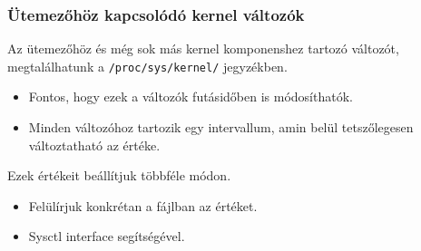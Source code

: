 \documentclass{beamer}
\begin{document}
\begin{frame}
\frametitle{ Ütemezőhöz kapcsolódó kernel változók}
Az ütemezőhöz és még sok más kernel komponenshez tartozó változót, megtalálhatunk a \texttt{/proc/sys/kernel/} jegyzékben.
\begin{itemize}
\item Fontos, hogy ezek a változók futásidőben is módosíthatók.
\item Minden változóhoz tartozik egy intervallum, amin belül tetszőlegesen változtatható az értéke. 
\end{itemize} 

Ezek értékeit beállítjuk többféle módon.
\begin{itemize}
\item Felülírjuk konkrétan a fájlban az értéket.
\item Sysctl interface segítségével.
\end{itemize}

\end{frame}
\end{document}
